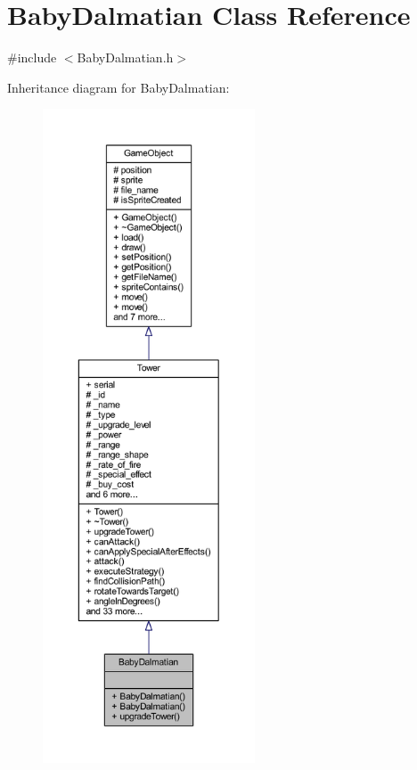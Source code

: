 \hypertarget{class_baby_dalmatian}{\section{Baby\+Dalmatian Class Reference}
\label{class_baby_dalmatian}
}


{\ttfamily \#include $<$Baby\+Dalmatian.\+h$>$}



Inheritance diagram for Baby\+Dalmatian\+:
\nopagebreak
\begin{figure}[H]
\begin{center}
\leavevmode
\includegraphics[height=550pt]{class_baby_dalmatian__inherit__graph}
\end{center}
\end{figure}


